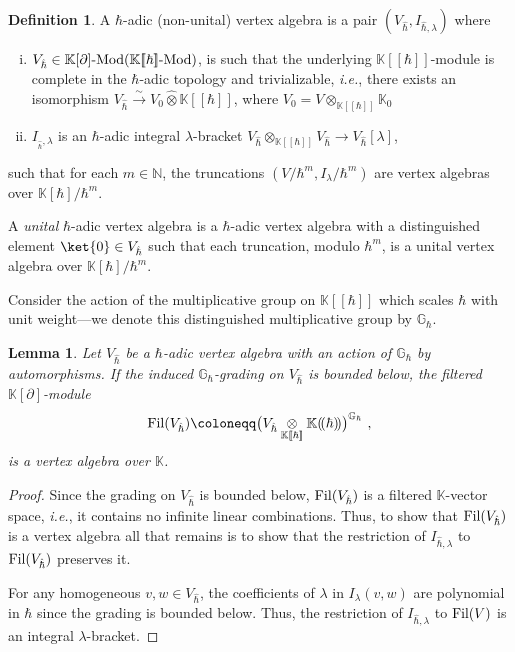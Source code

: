 \documentclass[11pt]{amsart}
\numberwithin{equation}{section}
\newtheorem{lemma}[theo]{Lemma}
\theoremstyle{definition}
\newtheorem{defn}[theo]{Definition}
\newcommand{\bb}{\mathbb}
\newcommand{\fph}{{[\![\hbar]\!]}}
\newcommand{\Mod}{{\textup{-Mod}}}
\newcommand{\ik}{{\bb K}}
\newcommand{\0}{{\textbf{0}}}
\def\IN{\mathbb{N}}
\def\IG{\mathbb{G}}
\def \ie{{\it i.e.}}
\newcommand{\tensor}[1]{\underset{#1}{\otimes}}
\def \hhb{{\hat \hbar}}
\begin{document}
\begin{defn}
	A $\hbar$-adic (non-unital) vertex algebra is a pair $(V_\hhb,I_{\hhb,\lambda})$ where 
	\begin{enumerate}[(i)]
		\item $V_\hhb\in\ik[\partial]\Mod(\ik\fph\Mod)$, is such that the underlying $\ik[\![\hbar]\!]$-module is complete in the $\hbar$-adic topology and trivializable, \ie, there exists an isomorphism $V_\hhb \xrightarrow{\sim} V_0 \widehat{\otimes}\ik\fph$, where $V_0 = V\otimes_{\ik\fph}\ik_0$
		\item $I_{_\hhb,\lambda}$ is an $\hbar$-adic integral $\lambda$-bracket $V_\hhb\otimes_{\ik\fph}V_\hhb\rightarrow V_\hhb[\lambda]$,
	\end{enumerate}
	such that for each $m\in \IN$, the truncations $(V/\hbar^m , I_{\lambda}/\hbar^m)$ are vertex algebras over $\ik[\hbar]/\hbar^m$. 

	A \emph{unital} $\hbar$-adic vertex algebra is a $\hbar$-adic vertex algebra with a distinguished element $\ket{0}\in V_\hhb$ such that each truncation, modulo $\hbar^m$, is a unital vertex algebra over $\ik[\hbar]/\hbar^m$. 
\end{defn}

Consider the action of the multiplicative group on $\ik\fph$ which scales $\hbar$ with unit weight---we denote this distinguished multiplicative group by $\IG_\hbar$. 

\begin{lemma}\label{lem:filtered is a VOA}
	Let $V_\hhb$ be a $\hbar$-adic vertex algebra with an action of $\IG_\hbar$ by automorphisms. If the induced $\IG_\hbar$-grading on $V_\hhb$ is bounded below, the filtered $\ik[\partial]$-module 
	\[
	{\rm Fil}(V_\hhb) \coloneqq \big( V_\hhb\tensor{\ik[\![\hbar]\!]} \ik(\!(\hbar)\!)\big)^{\IG_\hbar}~,
	\]
	is a vertex algebra over $\ik$. 
\end{lemma}
\begin{proof}
Since the grading on $V_\hhb$ is bounded below, ${\rm Fil}(V_\hhb)$ is a filtered $\ik$-vector space, \ie, it contains no infinite linear combinations. Thus, to show that ${\rm Fil}(V_\hhb)$ is a vertex algebra all that remains is to show that the restriction of $I_{\hhb,\lambda}$ to ${\rm Fil}(V_\hhb)$ preserves it. 

For any homogeneous $v,w\in V_\hhb$, the coefficients of $\lambda$ in $I_{\lambda}(v,w)$ are polynomial in $\hbar$ since the grading is bounded below. Thus, the restriction of $I_{\hhb,\lambda}$ to ${\rm Fil}(V)$ is an integral $\lambda$-bracket.
\end{proof}
\end{document}
